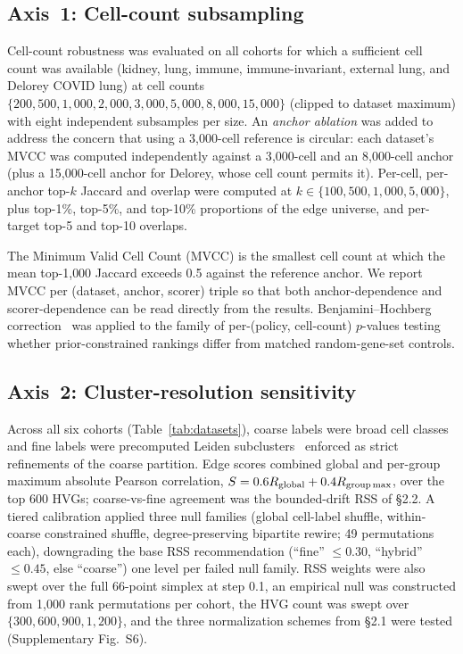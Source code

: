 \documentclass[unnumsec,webpdf,contemporary,large,namedate]{oup-authoring-template}
\begin{document}
\subsection{Axis~1: Cell-count subsampling}

Cell-count robustness was evaluated on all cohorts for which a
sufficient cell count was available (kidney, lung, immune,
immune-invariant, external lung, and Delorey COVID lung) at cell
counts $\{200, 500, 1{,}000, 2{,}000, 3{,}000, 5{,}000, 8{,}000,
15{,}000\}$ (clipped to dataset maximum) with eight independent
subsamples per size. An \emph{anchor ablation} was added to address
the concern that using a 3{,}000-cell reference is circular: each
dataset's MVCC was computed independently against a 3{,}000-cell and
an 8{,}000-cell anchor (plus a 15{,}000-cell anchor for Delorey,
whose cell count permits it). Per-cell, per-anchor top-$k$ Jaccard
and overlap were computed at $k \in \{100, 500, 1{,}000, 5{,}000\}$,
plus top-1\%, top-5\%, and top-10\% proportions of the edge universe,
and per-target top-5 and top-10 overlaps.

The Minimum Valid Cell Count (MVCC) is the smallest cell count at which
the mean top-1{,}000 Jaccard exceeds 0.5 against the reference anchor.
We report MVCC per (dataset, anchor, scorer) triple so that both
anchor-dependence and scorer-dependence can be read directly from
the results. Benjamini--Hochberg correction~\citep{BenjaminiHochberg1995}
was applied to the family of per-(policy, cell-count) $p$-values testing
whether prior-constrained rankings differ from matched random-gene-set
controls.

\subsection{Axis~2: Cluster-resolution sensitivity}

Across all six cohorts (Table~\ref{tab:datasets}), coarse labels
were broad cell classes and fine labels were precomputed Leiden
subclusters~\citep{Traag2019} enforced as strict refinements of the
coarse partition.
Edge scores combined global and per-group maximum absolute Pearson
correlation, $S = 0.6 R_{\text{global}} + 0.4 R_{\text{group\,max}}$,
over the top 600 HVGs; coarse-vs-fine agreement was the bounded-drift
RSS of §2.2. A tiered calibration applied three null families
(global cell-label shuffle, within-coarse constrained shuffle,
degree-preserving bipartite rewire; 49 permutations each), downgrading
the base RSS recommendation (``fine'' $\leq 0.30$, ``hybrid'' $\leq 0.45$,
else ``coarse'') one level per failed null family. RSS weights were
also swept over the full 66-point simplex at step 0.1, an empirical
null was constructed from 1{,}000 rank permutations per cohort, the
HVG count was swept over $\{300, 600, 900, 1{,}200\}$, and the three
normalization schemes from §2.1 were tested (Supplementary Fig.~S6).
\end{document}
